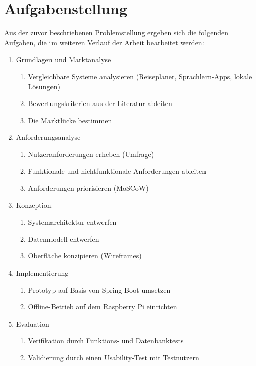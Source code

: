\documentclass[12pt,a4paper]{scrreprt}
\begin{document}
\section{Aufgabenstellung}
Aus der zuvor beschriebenen Problemstellung ergeben sich die folgenden Aufgaben, die im weiteren Verlauf der Arbeit bearbeitet werden:
\begin{enumerate}[label=\arabic*.]
    \item Grundlagen und Marktanalyse
    \begin{enumerate}[label*=\arabic*.]
        \item Vergleichbare Systeme analysieren (Reiseplaner, Sprachlern-Apps, lokale Lösungen)
        \item Bewertungskriterien aus der Literatur ableiten
        \item Die Marktlücke bestimmen
    \end{enumerate}
    \item Anforderungsanalyse
    \begin{enumerate}[label*=\arabic*.]
        \item Nutzeranforderungen erheben (Umfrage)
        \item Funktionale und nichtfunktionale Anforderungen ableiten
        \item Anforderungen priorisieren (MoSCoW)
    \end{enumerate}
    \item Konzeption
    \begin{enumerate}[label*=\arabic*.]
        \item Systemarchitektur entwerfen
        \item Datenmodell entwerfen
        \item Oberfläche konzipieren (Wireframes)
    \end{enumerate}
    \item Implementierung
    \begin{enumerate}[label*=\arabic*.]
        \item Prototyp auf Basis von Spring Boot umsetzen
        \item Offline-Betrieb auf dem Raspberry Pi einrichten
    \end{enumerate}
    \item Evaluation
    \begin{enumerate}[label*=\arabic*.]
        \item Verifikation durch Funktions- und Datenbanktests
        \item Validierung durch einen Usability-Test mit Testnutzern
    \end{enumerate}
\end{enumerate}
\end{document}
